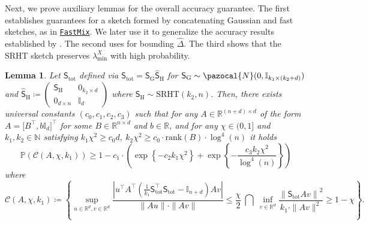 \documentclass[11pt]{article}
\newtheorem{lem}{Lemma}
\theoremstyle{definition}
\theoremstyle{plain}
\newcommand{\reals}{\mathbb{R}}
\newcommand{\nats}{\mathbb{N}}
\providecommand{\brI}{\mathbb{I}}
\newcommand{\Norm}[1]{\left\| #1 \right\|}
\providecommand{\norm}[1]{\Norm{#1}}
\newcommand{\pN}{\pazocal{N}}
\newcommand{\FastMix}{\hyperref[alg:fast_mixing]{\texttt{FastMix}}\xspace}
\begin{document}
Next, we prove auxiliary lemmas for the overall accuracy guarantee. The first establishes guarantees for a sketch formed by concatenating Gaussian and fast sketches, as in \FastMix. We later use it to generalize the accuracy results established by \citet{lev2026near}. The second uses \citep[Theorem.~1]{cohen2016optimal_amm} for bounding $\widehat{\Delta}$. The third shows that the SRHT sketch preserves $\lambda^{X}_{\min}$ with high probability.
\begin{lem}
\label{lem:probability_pilanci_concatenated}
    Let $\mathsf{S}_{\mathrm{tot}}$ defined via $\mathsf{S}_{\mathrm{tot}} = \mathsf{S}_{\mathrm{G}}\widehat{\mathsf{S}}_{\mathrm{H}}$ for $\mathsf{S}_{\mathrm{G}}\sim \pN(0, \brI_{k_1\times (k_2 + d)})$ and $\widehat{\mathsf{S}}_{\mathrm{H}} \coloneq \begin{pmatrix}
        \mathsf{S}_{\mathrm{H}} & 0_{k_2\times d} \\ 0_{d\times n} & \brI_d
    \end{pmatrix}$ where $\mathsf{S}_{\mathrm{H}} \sim \mathrm{SRHT}(k_2, n)$. Then, there exists universal constants $(c_0, c_1, c_2, c_3)$ such that for any $A \in \reals^{(n+d)\times d}$ of the form $A = \Big[B^{\top}, b\brI_d\Big]^{\top}$ for some $B \in \reals^{n\times d}$ and $b\in \reals$, and for any $\chi \in (0, 1]$ and $k_1, k_2\in \nats$ satisfying $k_1\chi^2 \geq c_0d,\  k_2\chi^2 \geq c_0\cdot \mathrm{rank}\left(B\right)\cdot \log^4(n)$ it holds 
    \begin{equation}
        \mathbb{P}\left(\mathcal{C}\left(A, \chi, k_1\right) \right) \geq 1 - c_1 \cdot \left(\exp\left\{-c_2k_1\chi^2\right\} + \exp\left\{-\frac{c_3k_2\chi^2}{\log^4(n)}\right\}\right)
    \end{equation}
    where 
    \begin{equation}
        \mathcal{C}(A, \chi, k_1) \coloneq \left\{\sup_{u \in \reals^{d}, v \in \reals^{d}} \frac{\left|u^{\top}A^{\top}\left(\frac{1}{k_1}\mathsf{S}_{\mathrm{tot}}^{\top}\mathsf{S}_{\mathrm{tot}} - \brI_{n+d}\right) A v\right|}{\|A u\| \cdot \|A v\|} \leq \frac{\chi}{2} \ \bigcap\ \inf_{v \in \reals^{d}} \frac{\norm{\mathsf{S}_{\mathrm{tot}}A v}^2}{k_1 \cdot \|Av\|^{2}} \geq 1-\chi\right\}.
    \end{equation}
\end{lem}
\end{document}
